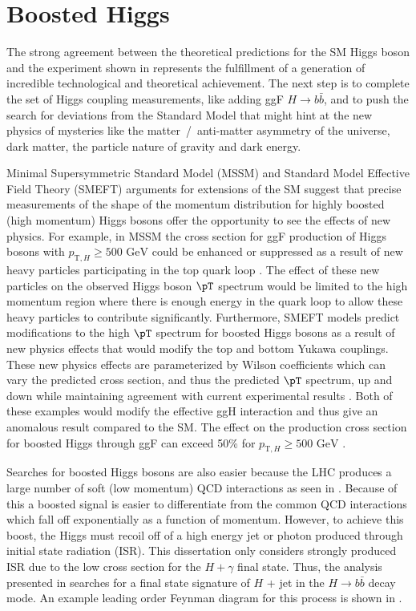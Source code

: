 \section{Boosted Higgs} \label{sec:higgs:boosted}

The strong agreement between the theoretical predictions for the SM Higgs boson
and the experiment shown in  represents the
fulfillment of a generation of incredible technological and theoretical
achievement.  The next step is to complete the set of Higgs coupling
measurements, like adding ggF $H \rightarrow b\bar{b}$, and to push the search
for deviations from the Standard Model that might hint at the new physics of
mysteries like the matter~/~anti-matter asymmetry of the universe, dark matter,
the particle nature of gravity and dark energy. 

Minimal Supersymmetric Standard Model (MSSM) and Standard Model Effective Field
Theory (SMEFT) arguments for extensions of the SM suggest that precise
measurements of the shape of the momentum distribution for highly boosted (high
momentum) Higgs bosons offer the opportunity to see the effects of new physics.
For example, in MSSM the cross section for ggF production of Higgs bosons with
$p_{\text{T},H} \geq \text{500 GeV}$ could be enhanced or suppressed as a
result of new heavy particles participating in the top quark loop
\cite{Schlaffer:2014osa}. The effect of these new particles on the observed
Higgs boson $\pT$ spectrum would be limited to the high momentum region where
there is enough energy in the quark loop to allow these heavy particles to
contribute significantly. Furthermore,  SMEFT models predict modifications to
the high $\pT$ spectrum for boosted Higgs bosons as a result of new physics
effects that would modify the top and bottom Yukawa couplings.  These new
physics effects are parameterized by Wilson coefficients which can vary the
predicted cross section, and thus the predicted $\pT$ spectrum, up and down
while maintaining agreement with current experimental results
\cite{Grazzini:2016paz}. Both of these examples would modify the effective ggH
interaction and thus give an anomalous result compared to the SM. The effect on
the production cross section for boosted Higgs through ggF can exceed 50\% for
$p_{\text{T},H} \geq \text{500 GeV}$
\cite{Schlaffer:2014osa,Grojean:2013nya,Grazzini:2016paz,Dawson:2015gka}.

Searches for boosted Higgs bosons are also easier because the LHC produces a
large number of soft (low momentum) QCD interactions as seen in
.  Because of this a boosted signal is easier
to differentiate from the common QCD interactions which fall off exponentially
as a function of momentum.  However, to achieve this boost, the Higgs must
recoil off of a high energy jet or photon \cite{Aaboud:2018zba} produced
through initial state radiation (ISR). This dissertation only considers
strongly produced ISR due to the low cross section for the $H + \gamma$ final
state.  Thus, the analysis presented in  searches for a final
state signature of $H$ + jet in the $H \rightarrow b\bar{b}$ decay mode.  An
example leading order Feynman diagram for this process is shown in
.

